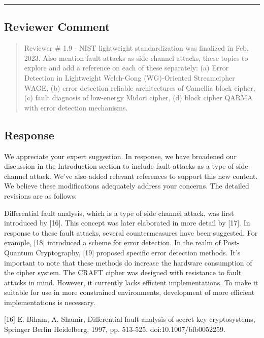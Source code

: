 \color{black}

\noindent\rule{\linewidth}{2.0pt}

\subsection{Reviewer Comment}
\begin{mdframed}
	\begin{quote}
		Reviewer \# 1.9 - NIST lightweight standardization was finalized in Feb. 2023. Also mention fault attacks as side-channel attacks, these topics to explore and add a reference on each of these separately: (a) Error Detection in Lightweight Welch-Gong (WG)-Oriented Streamcipher WAGE, (b) error detection reliable architectures of Camellia block cipher, (c) fault diagnosis of low-energy Midori cipher, (d) block cipher QARMA with error detection mechanisms.
	\end{quote}
\end{mdframed}

\subsection{Response}

We appreciate your expert suggestion. In response, we have broadened our discussion in the Introduction section to include fault attacks as a type of side-channel attack. We've also added relevant references to support this new content. We believe these modifications adequately address your concerns. The detailed revisions are as follows:

\color{blue}

Differential fault analysis, which is a type of side channel attack, was first introduced by [16]. This concept was later elaborated in more detail by [17]. In response to these fault attacks, several countermeasures have been suggested. For example, [18] introduced a scheme for error detection. In the realm of Post-Quantum Cryptography, [19] proposed specific error detection methods. It's important to note that these methods do increase the hardware consumption of the cipher system. The CRAFT cipher was designed with resistance to fault attacks in mind. However, it currently lacks efficient implementations. To make it suitable for use in more constrained environments, development of more efficient implementations is necessary.

	[16] E. Biham, A. Shamir, Differential fault analysis of secret key cryptosystems, Springer Berlin Heidelberg, 1997, pp. 513-525. doi:10.1007/bfb0052259.


